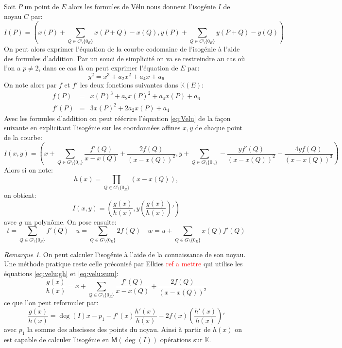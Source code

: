 \documentclass[10pt,a4paper]{book}
\theoremstyle{plain}
\theoremstyle{definition}
\theoremstyle{definition}
\theoremstyle{definition}
\theoremstyle{definition}
\theoremstyle{remark}
\newtheorem{rem}[thm]{Remarque}
\theoremstyle{remark}
\begin{document}
Soit $P$ un point de $E$ alors les formules de Vélu nous donnent l'isogénie $I$ de noyau $C$ par: 
\begin{equation}
\label{eq:Velu}
I(P)= \left( x(P)+\sum_{Q \in C \setminus \{0_E\}} x(P+Q)-x(Q),y(P)+\sum_{Q \in C \setminus \{0_E\}} y(P+Q)-y(Q) \right)
\end{equation} 
On peut alors exprimer l'équation de la courbe codomaine de l'isogénie à l'aide des formules d'addition. Par un souci de simplicité on va se restreindre au cas où l'on a $p \neq 2$, dans ce cas là on peut exprimer l'équation de $E$ par:
\begin{equation*}
y^2=x^3+a_2 x^2 + a_4 x + a_6
\end{equation*}
On note alors par $f$ et $f'$ les deux fonctions suivantes dans $\mathbb{K}(E)$:
\begin{align*}
f(P)&=& x(P)^3+a_2x(P)^2+a_4x(P)+a_6 \\
f'(P)&=& 3x(P)^2+2a_2x(P)+a_4
\end{align*}
Avec les formules d'addition on peut réécrire l'équation \eqref{eq:Velu} de la façon suivante en explicitant l'isogénie sur les coordonnées affines $x,y$ de chaque point de la courbe:
\begin{equation} \label{eq:velu:sum}
I(x,y)=\left( x + \sum_{Q \in G \setminus \{0_E\}} \frac{f'(Q)}{x-x(Q)}+\frac{2f(Q)}{(x-x(Q))^2} , y + \sum_{Q \in G \setminus \{0_E\}} -\frac{yf'(Q)}{(x-x(Q))^2}-\frac{4yf(Q)}{(x-x(Q))^3}  \right)
\end{equation}
Alors si on note: 
\begin{equation*}
h(x)=\prod_{Q \in G \setminus \{0_E\}}(x-x(Q)),
\end{equation*}
on obtient:
\begin{equation} 
\label{eq:velu:gh}
I(x,y)=\left(\frac{g(x)}{h(x)},y\left( \frac{g(x)}{h(x)} \right)'\right)
\end{equation}
avec $g$ un polynôme. On pose ensuite:
\begin{equation*}
t= \sum_{Q \in G \setminus \{0_E\}} f'(Q) \quad u=\sum_{Q \in G \setminus \{0_E\}} 2f(Q) \quad w=u+\sum_{Q \in G \setminus \{0_E\}}x(Q)f'(Q) 
\end{equation*}

\begin{rem}
On peut calculer l'isogénie à l'aide de la connaissance de son noyau. Une méthode pratique reste celle préconisé par Elkies \cite{elkies1998} \textcolor{red}{ref a mettre} qui utilise les équations \eqref{eq:velu:gh} et \eqref{eq:velu:sum}:
\begin{equation*}
\frac{g(x)}{h(x)}= x + \sum_{Q \in G \setminus \{0_E\}} \frac{f'(Q)}{x-x(Q)}+\frac{2f(Q)}{(x-x(Q))^2}
\end{equation*}
ce que l'on peut reformuler par:
\begin{equation}
\frac{g(x)}{h(x)}= \deg(I) x -p_1 - f'(x) \frac{h'(x)}{h(x)} -2f(x)  \left(\frac{h'(x)}{h(x)}\right)'
\end{equation}
avec $p_1$ la somme des abscisses des points du noyau. Ainsi à partir de $h(x)$ on est capable de calculer l'isogénie en $\mathsf{M}(\deg(I))$ opérations sur $\mathbb{K}$.
\end{rem}
\end{document}
